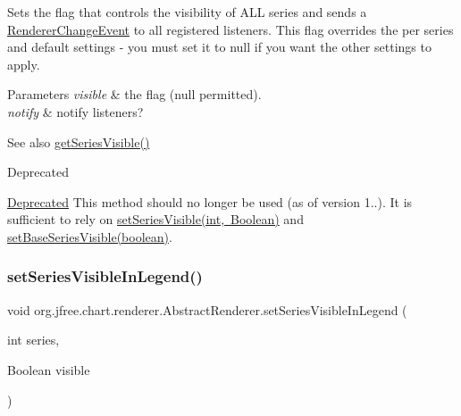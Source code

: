 Sets the flag that controls the visibility of A\+LL series and sends a \mbox{\hyperlink{}{Renderer\+Change\+Event}} to all registered listeners. This flag overrides the per series and default settings -\/ you must set it to {\ttfamily null} if you want the other settings to apply.


\begin{DoxyParams}{Parameters}
{\em visible} & the flag ({\ttfamily null} permitted). \\
\hline
{\em notify} & notify listeners?\\
\hline
\end{DoxyParams}
\begin{DoxySeeAlso}{See also}
\mbox{\hyperlink{classorg_1_1jfree_1_1chart_1_1renderer_1_1_abstract_renderer_a2779761677dd1fc3387fde96068b0b85}{get\+Series\+Visible()}}
\end{DoxySeeAlso}
\begin{DoxyRefDesc}{Deprecated}
\item[\mbox{\hyperlink{deprecated__deprecated000112}{Deprecated}}]This method should no longer be used (as of version 1..). It is sufficient to rely on \mbox{\hyperlink{classorg_1_1jfree_1_1chart_1_1renderer_1_1_abstract_renderer_a4311b798698e141c2fb2deb6a412283f}{set\+Series\+Visible(int, Boolean)}} and \mbox{\hyperlink{classorg_1_1jfree_1_1chart_1_1renderer_1_1_abstract_renderer_af5e2fb8863761c1e74ff957a7c13ba78}{set\+Base\+Series\+Visible(boolean)}}. \end{DoxyRefDesc}
\mbox{\label{classorg_1_1jfree_1_1chart_1_1renderer_1_1_abstract_renderer_ab2f6f64f253e3e762ceb32274d79d6ad}} 
\subsubsection{\texorpdfstring{set\+Series\+Visible\+In\+Legend()}{setSeriesVisibleInLegend()}\hspace{0.1cm}{\footnotesize\ttfamily [1/4]}}
{\footnotesize\ttfamily void org.\+jfree.\+chart.\+renderer.\+Abstract\+Renderer.\+set\+Series\+Visible\+In\+Legend (\begin{DoxyParamCaption}\item[{int}]{series,  }\item[{Boolean}]{visible }\end{DoxyParamCaption})}

